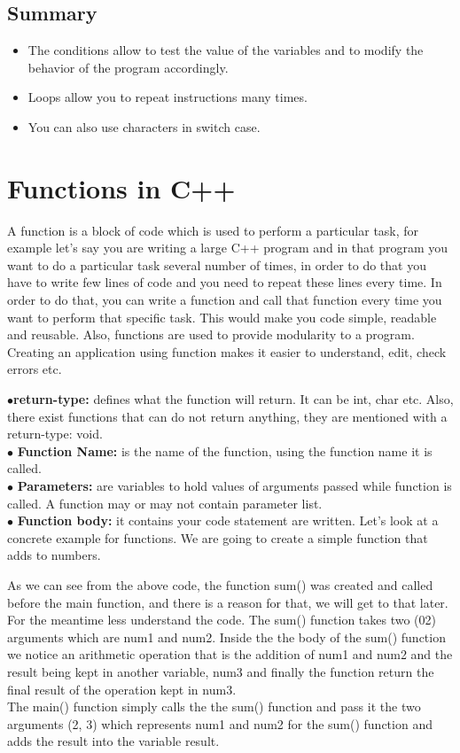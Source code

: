 \documentclass[11pt, a4paper]{article}
\begin{document}
\subsection{Summary}
\begin{itemize}
    \item The conditions allow to test the value of the variables and to modify the behavior
     of the program accordingly.
     \item Loops allow you to repeat instructions many times.
     \item You can also use characters in switch case.
\end{itemize}

\newpage
\section{Functions in C++}
A function is a block of code which is used to perform a particular task,
for example let’s say you are writing a large C++ program and in that program
you want to do a particular task several number of times, in order to do that you
have to write few lines of code and you need
to repeat these lines every time. In order
to do that, you can write a function and call that function every time you
want to perform that specific task. This would make you code simple,
readable and reusable. Also, functions are used to provide modularity to a program.
Creating an application using function makes it easier to understand, edit,
check errors etc.

$\bullet$\textbf{return-type:} defines what the function will return. It can be int,
char etc. Also, there exist functions that can do not return anything, they are mentioned
with a return-type: void.\\
$\bullet$ \textbf{Function Name:} is the name of the function, using the function
name it is called.\\
$\bullet$ \textbf{Parameters:} are variables to hold values of arguments passed while
function is called. A function may or may not contain parameter list.\\
$\bullet$ \textbf{Function body:} it contains your code statement are written.
Let's look at a concrete example for functions. We are going to create a simple function that
adds to numbers.

As we can see from the above code, the function sum() was created and called before the main
function, and there is a reason for that, we will get to that later. For the meantime
less understand the code. The sum() function takes two (02) arguments which are
num1 and num2. Inside the the body of the sum() function we notice an arithmetic
operation that is the addition of num1 and num2 and the result being kept in another
variable, num3 and finally the function return the final result of the operation kept
in num3.\\
The main() function simply calls the the sum() function and pass it the two arguments
(2, 3) which represents num1 and num2 for the sum() function and adds the result
into the variable result.
\end{document}
